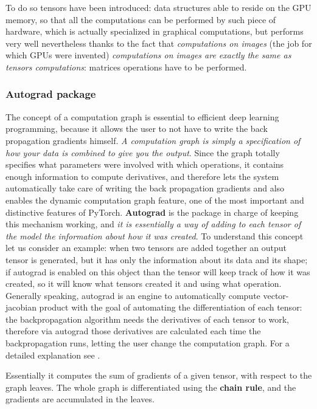 \documentclass[11pt,a4paper,titlepage]{book}
\begin{document}
To do so tensors have been introduced: data structures able to reside on the GPU memory, so that all the computations can be performed by such piece of hardware, which is actually specialized in graphical computations, but performs very well nevertheless thanks to the fact that \textit{computations on images} (the job for which GPUs were invented) \textit{computations on images are exactly the same as tensors computations}: matrices operations have to be performed.
\subsubsection{Autograd package}
The concept of a computation graph is essential to efficient deep learning programming, because it allows the user to not have to write the back propagation gradients himself. \textit{A computation graph is simply a specification of how your data is combined to give you the output}.
\newline
Since the graph totally specifies what parameters were involved with which operations, it contains enough information to compute derivatives, and therefore lets the system automatically take care of writing the back propagation gradients and also enables the dynamic computation graph feature, one of the most important and distinctive features of PyTorch.
\newline
\newline
\textbf{Autograd} is the package in charge of keeping this mechanism working, and \textit{it is essentially a way of adding to each tensor of the model the information about how it was created}. To understand this concept let us consider an example: when two tensors are added together an output tensor is generated, but it has only the information about its data and its shape; if autograd is enabled on this object than the tensor will keep track of how it was created, so it will know what tensors created it and using what operation.
\newline
\newline
Generally speaking, autograd is an engine to automatically compute vector-jacobian product with the goal of automating the differentiation of each tensor: the backpropagation algorithm needs the derivatives of each tensor to work, therefore via autograd those derivatives are calculated each time the backpropagation runs, letting the user change the computation graph. For a detailed explanation see \cite{pytorch-autograd}.

Essentially it computes the sum of gradients of a given tensor, with respect to the graph leaves. The whole graph is differentiated using the \textbf{chain rule}, and the gradients are accumulated in the leaves.
\end{document}
